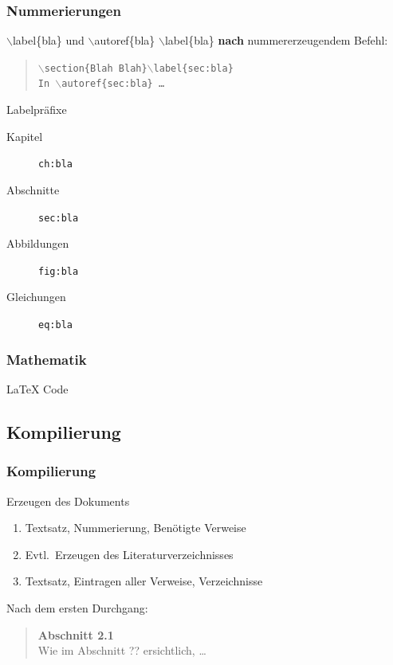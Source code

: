 \documentclass{beamer}
\begin{document}
\begin{frame}
	\frametitle{Nummerierungen}
	\begin{block}{$\backslash$label\{bla\} und $\backslash$autoref\{bla\}}
		$\backslash$label\{bla\} {\bf nach} nummererzeugendem Befehl:\\[3mm]
		\begin{quote}
			{\tt $\backslash$section\{Blah
			Blah\}$\backslash$label\{sec:bla\}}\\[3mm]

			{\tt In $\backslash$autoref\{sec:bla\} \ldots}
		\end{quote}
	\end{block}

	\begin{block}{Labelpräfixe}
		\begin{description}
			\item[Kapitel] {\tt ch:bla}\\
			\item[Abschnitte] {\tt sec:bla}\\
			\item[Abbildungen] {\tt fig:bla}\\
			\item[Gleichungen] {\tt eq:bla}\\
		\end{description}
	\end{block}
\end{frame}

\begin{frame}
	\frametitle{Mathematik}
	
	\vspace{-6mm}
	\begin{block}{\LaTeX{} Code}
	\end{block}
\end{frame}

\subsection{Kompilierung}
\begin{frame}
	\frametitle{Kompilierung}
	\begin{block}{Erzeugen des Dokuments}
		\begin{enumerate}
			\item Textsatz, Nummerierung, Benötigte Verweise
			\item Evtl.\ Erzeugen des Literaturverzeichnisses
			\item Textsatz, Eintragen aller Verweise, Verzeichnisse
		\end{enumerate}
	\end{block}
	\begin{example}
		Nach dem ersten Durchgang:\\[2mm]
		\begin{quote}
			\rm
			{\large \bf Abschnitt 2.1}\\
			{Wie im Abschnitt ?? ersichtlich, \ldots}
		\end{quote}
	\end{example}
\end{frame}
\end{document}

